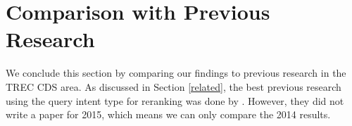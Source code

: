 %
%
%

\section{Comparison with Previous Research}
We conclude this section by comparing our findings to previous research in the TREC CDS area.
As discussed in Section \ref{related}, the best previous research using the query intent type for reranking
was done by \cite{choi}. However, they did not write a paper for 2015, which means we can only compare the 2014 results.

